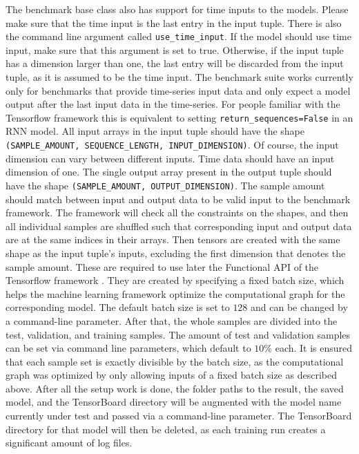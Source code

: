\documentclass[draft,final]{vutinfth} %
\begin{document}
The benchmark base class also has support for time inputs to the models.
Please make sure that the time input is the last entry in the input tuple.
There is also the command line argument called \texttt{use\_time\_input}.
If the model should use time input, make sure that this argument is set to true.
Otherwise, if the input tuple has a dimension larger than one, the last entry will be discarded from the input tuple, as it is assumed to be the time input.
The benchmark suite works currently only for benchmarks that provide time-series input data and only expect a model output after the last input data in the time-series.
For people familiar with the Tensorflow framework \cite{Tensorflow} this is equivalent to setting \texttt{return\_sequences=False} in an RNN model.
All input arrays in the input tuple should have the shape \texttt{(SAMPLE\_AMOUNT, SEQUENCE\_LENGTH, INPUT\_DIMENSION)}.
Of course, the input dimension can vary between different inputs. Time data should have an input dimension of one.
The single output array present in the output tuple should have the shape \texttt{(SAMPLE\_AMOUNT, OUTPUT\_DIMENSION)}.
The sample amount should match between input and output data to be valid input to the benchmark framework.
The framework will check all the constraints on the shapes, and then all individual samples are shuffled such that corresponding input and output data are at the same indices in their arrays.
Then tensors are created with the same shape as the input tuple's inputs, excluding the first dimension that denotes the sample amount.
These are required to use later the Functional API of the Tensorflow framework \cite{Tensorflow}.
They are created by specifying a fixed batch size, which helps the machine learning framework optimize the computational graph for the corresponding model.
The default batch size is set to $128$ and can be changed by a command-line parameter.
After that, the whole samples are divided into the test, validation, and training samples. The amount of test and validation samples can be set via command line parameters, which default to $10\%$ each.
It is ensured that each sample set is exactly divisible by the batch size, as the computational graph was optimized by only allowing inputs of a fixed batch size as described above.
After all the setup work is done, the folder paths to the result, the saved model, and the TensorBoard directory will be augmented with the model name currently under test and passed via a command-line parameter.
The TensorBoard directory for that model will then be deleted, as each training run creates a significant amount of log files.
\end{document}
